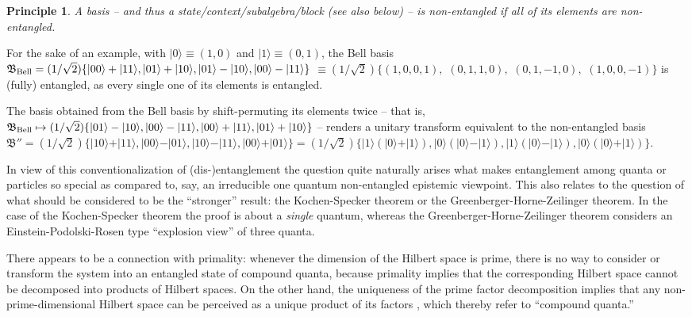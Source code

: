 \documentclass[%
  preprint,
 showpacs,
 showkeys,
 preprintnumbers,
 amsmath,amssymb,
 aps,
   pra,
  longbibliography,
 ]{revtex4-1}
\newtheorem{conjecture}[question]{Principle}
\begin{document}
{\color{blue} \begin{conjecture}
A basis -- and thus a state/context/subalgebra/block (see also below) -- is non-entangled if all of its elements are non-entangled.
\end{conjecture}   }
For the sake of an example, with $\vert 0 \rangle \equiv (1,0)$ and  $\vert 1 \rangle \equiv (0,1)$, the Bell basis
${\mathfrak B}_{\rm Bell}
=
(1/\sqrt{2}) \{
\vert 00 \rangle + \vert 11 \rangle, \vert 01 \rangle + \vert 10 \rangle ,
\vert 01 \rangle - \vert 10 \rangle  , \vert 00 \rangle - \vert 11 \rangle
\}
$
$
\equiv
(1/\sqrt{2}) \{(1, 0, 0, 1),$ $(0, 1, 1, 0),$ $(0, 1, -1, 0),$ $(1, 0, 0, -1) \}$
is (fully) entangled, as every single one of its elements is entangled.

The basis obtained from the Bell basis by shift-permuting its elements \cite{Schwinger.60}  twice
--
that is,   ${\mathfrak B}_{\rm Bell} \mapsto
(1/\sqrt{2}) \{
\vert 01 \rangle - \vert 10 \rangle  , \vert 00 \rangle - \vert 11 \rangle  , \vert 00 \rangle + \vert 11 \rangle,  \vert 01 \rangle + \vert 10 \rangle
\}$
--
renders a unitary transform equivalent to the  non-entangled basis
 ${\mathfrak B}'' =
(1/\sqrt{2}) \{
\vert 10 \rangle + \vert 11\rangle  , \vert 00 \rangle - \vert 01 \rangle  , \vert 10 \rangle - \vert 11 \rangle,  \vert 00 \rangle + \vert 01 \rangle
\}
=
(1/\sqrt{2}) \{
\vert 1 \rangle (\vert 0 \rangle + \vert 1\rangle ) , \vert 0 \rangle (\vert 0 \rangle - \vert 1 \rangle )  ,
\vert 1  \rangle (\vert  0 \rangle - \vert  1 \rangle), \vert 0 \rangle ( \vert  0 \rangle + \vert  1 \rangle )
\}
$.


In view of this conventionalization of (dis-)entanglement
the question quite naturally arises what makes entanglement among quanta or particles so special as compared to, say,
an irreducible one quantum non-entangled epistemic viewpoint.
This also relates to the question of what should be considered to be the ``stronger'' result:
the Kochen-Specker theorem or the Greenberger-Horne-Zeilinger theorem.
In the case of the Kochen-Specker theorem the proof is about a {\em single} quantum,
whereas the Greenberger-Horne-Zeilinger theorem considers an Einstein-Podolski-Rosen type ``explosion view'' of three quanta.

There appears to be a connection with primality: whenever the dimension of the Hilbert space is prime, there is no way to consider or transform
the system into an entangled state of compound quanta,
because primality implies that the corresponding Hilbert space cannot be decomposed into products of Hilbert spaces.
On the other hand, the uniqueness of the prime factor decomposition implies that any non-prime-dimensional Hilbert space can be perceived
as a unique product of its factors \cite{Schwinger.60,Ellinas-99,Revzen-06,PhysRevA.78.012101,Simkhovich-10}, which thereby refer to ``compound quanta.''
\end{document}
